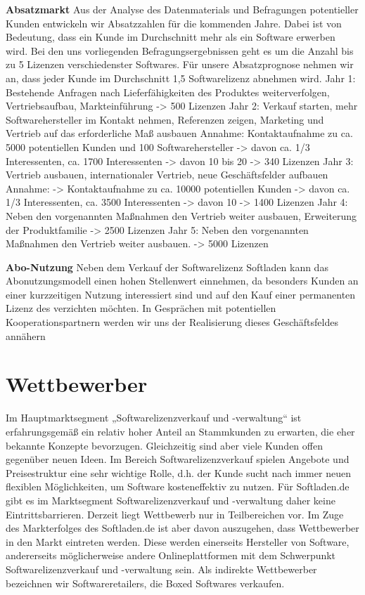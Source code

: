 \textbf{Absatzmarkt}
Aus der Analyse des Datenmaterials und Befragungen potentieller Kunden entwickeln wir
Absatzzahlen für die kommenden Jahre. Dabei ist von Bedeutung, dass ein Kunde im
Durchschnitt mehr als ein Software erwerben wird. Bei den uns vorliegenden Befragungsergebnissen
geht es um die Anzahl bis zu 5 Lizenzen verschiedenster Softwares. Für unsere Absatzprognose nehmen wir an, dass jeder Kunde im Durchschnitt 1,5 Softwarelizenz abnehmen
wird.
Jahr 1:
Bestehende Anfragen nach Lieferfähigkeiten des Produktes weiterverfolgen, Vertriebsaufbau, Markteinführung
-> 500 Lizenzen
Jahr 2:
Verkauf starten, mehr Softwarehersteller im Kontakt nehmen, Referenzen zeigen, Marketing und Vertrieb auf das erforderliche Maß ausbauen
Annahme:
Kontaktaufnahme zu ca. 5000 potentiellen Kunden und 100 Softwarehersteller
-> davon ca. 1/3 Interessenten, ca. 1700 Interessenten
-> davon 10 bis 20%
-> 340 Lizenzen
Jahr 3:
Vertrieb ausbauen, internationaler Vertrieb, neue Geschäftsfelder aufbauen
Annahme: 
-> Kontaktaufnahme zu ca. 10000 potentiellen Kunden
-> davon ca. 1/3 Interessenten, ca. 3500 Interessenten
-> davon 10%
-> 1400 Lizenzen
Jahr 4:
Neben den vorgenannten Maßnahmen den Vertrieb weiter ausbauen, Erweiterung der
Produktfamilie
-> 2500 Lizenzen
Jahr 5:
Neben den vorgenannten Maßnahmen den Vertrieb weiter ausbauen.
-> 5000 Lizenzen

\textbf{Abo-Nutzung}
Neben dem Verkauf der Softwarelizenz Softladen kann das Abonutzungsmodell einen hohen Stellenwert einnehmen, da besonders Kunden an einer kurzzeitigen Nutzung interessiert sind und auf
den Kauf einer permanenten Lizenz des verzichten möchten.
In Gesprächen mit potentiellen Kooperationspartnern werden wir uns der Realisierung dieses Geschäftsfeldes annähern 

\section{Wettbewerber}
Im Hauptmarktsegment „Softwarelizenzverkauf und -verwaltung“ ist erfahrungsgemäß ein relativ hoher Anteil an Stammkunden zu erwarten, die eher bekannte Konzepte bevorzugen. Gleichzeitig sind aber viele Kunden offen gegenüber neuen Ideen. Im Bereich Softwarelizenzverkauf spielen Angebote und Preisestruktur eine sehr wichtige Rolle, d.h. der Kunde sucht nach immer neuen flexiblen Möglichkeiten, um Software kosteneffektiv zu nutzen. Für Softladen.de gibt es im Marktsegment Softwarelizenzverkauf und -verwaltung daher keine Eintrittsbarrieren. Derzeit liegt Wettbewerb nur in Teilbereichen vor. Im Zuge des Markterfolges des Softladen.de ist aber davon auszugehen, dass Wettbewerber in den Markt eintreten werden. Diese werden einerseits Hersteller von Software, andererseits möglicherweise andere Onlineplattformen mit dem Schwerpunkt Softwarelizenzverkauf und -verwaltung  sein.
Als indirekte Wettbewerber bezeichnen wir Softwareretailers, die Boxed Softwares verkaufen.

